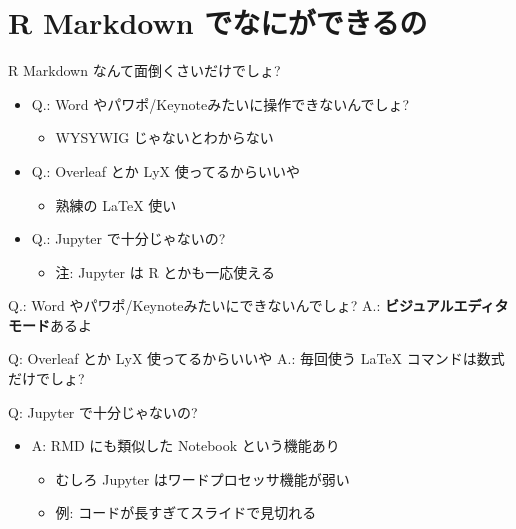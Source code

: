 \documentclass[
  ignorenonframetext,
]{beamer}
\providecommand{\tightlist}{%
  \setlength{\itemsep}{0pt}\setlength{\parskip}{0pt}}
\begin{document}
\hypertarget{r-markdown-ux3067ux306aux306bux304cux3067ux304dux308bux306e}{%
\section{R Markdown でなにができるの}\label{r-markdown-ux3067ux306aux306bux304cux3067ux304dux308bux306e}}

\begin{frame}{R Markdown なんて面倒くさいだけでしょ?}
\protect\hypertarget{r-markdown-ux306aux3093ux3066ux9762ux5012ux304fux3055ux3044ux3060ux3051ux3067ux3057ux3087}{}
\begin{itemize}
\item
  Q.: Word やパワポ/Keynoteみたいに操作できないんでしょ?

  \begin{itemize}
  \tightlist
  \item
    WYSYWIG じゃないとわからない
  \end{itemize}
\item
  Q.: Overleaf とか LyX 使ってるからいいや

  \begin{itemize}
  \tightlist
  \item
    熟練の LaTeX 使い
  \end{itemize}
\item
  Q.: Jupyter で十分じゃないの?

  \begin{itemize}
  \tightlist
  \item
    注: Jupyter は R とかも一応使える
  \end{itemize}
\end{itemize}
\end{frame}

\begin{frame}{Q.: Word やパワポ/Keynoteみたいにできないんでしょ?}
\protect\hypertarget{q.-word-ux3084ux30d1ux30efux30ddkeynoteux307fux305fux3044ux306bux3067ux304dux306aux3044ux3093ux3067ux3057ux3087}{}
A.: \textbf{ビジュアルエディタモード}あるよ
\end{frame}

\begin{frame}{Q: Overleaf とか LyX 使ってるからいいや}
\protect\hypertarget{q-overleaf-ux3068ux304b-lyx-ux4f7fux3063ux3066ux308bux304bux3089ux3044ux3044ux3084}{}
A.: 毎回使う LaTeX コマンドは数式だけでしょ?
\end{frame}

\begin{frame}{Q: Jupyter で十分じゃないの?}
\protect\hypertarget{q-jupyter-ux3067ux5341ux5206ux3058ux3083ux306aux3044ux306e}{}
\begin{itemize}
\tightlist
\item
  A: RMD にも類似した Notebook という機能あり

  \begin{itemize}
  \tightlist
  \item
    むしろ Jupyter はワードプロセッサ機能が弱い
  \item
    例: コードが長すぎてスライドで見切れる
  \end{itemize}
\end{itemize}
\end{frame}
\end{document}
